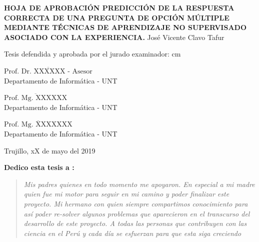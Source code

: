\begin{center}
 {\bf {\Large HOJA DE APROBACIÓN }     
 \vskip 1.5cm
  {\Large PREDICCIÓN DE LA RESPUESTA CORRECTA DE UNA PREGUNTA DE OPCIÓN MÚLTIPLE MEDIANTE TÉCNICAS DE APRENDIZAJE NO SUPERVISADO ASOCIADO CON LA EXPERIENCIA.}}
 \vskip 1cm 
  {\large{José Vicente Clavo Tafur}}\\

 \vskip 1cm
\end{center} 
Tesis defendida y aprobada por el jurado examinador:
 cm
\begin{flushleft} 
$\overline{\mbox{Prof. Dr. XXXXXX - Asesor}}$\\
\vskip -0.5cm
Departamento de Informática - UNT
\end{flushleft} 
\vskip 1cm
\begin{flushleft} 
$\overline{\mbox{Prof. Mg. XXXXXX}}$\\
\vskip -0.5cm
Departamento de Informática - UNT
\end{flushleft} 
\vskip 1cm
\begin{flushleft} 
$\overline{\mbox{Prof. Mg. XXXXXXX}}$\\
\vskip -0.5cm
Departamento de Informática - UNT
\end{flushleft}
\vskip 0.8cm 
\begin{center}    
Trujillo, xX de mayo del 2019
\end{center} 
\newpage


 
 {\bf\Large {Dedico esta tesis a :}}
 \vskip 1cm
\begin{quotation}
{\it Mis padres quienes en todo momento me apoyaron. En especial a mi madre quien fue mi motor para seguir en mi camino y poder finalizar este proyecto.
\vskip 1cm
Mi hermano con quien siempre compartimos conocimiento para así poder re-solver algunos problemas que aparecieron en el transcurso del desarrollo de este proyecto.
\vskip 1cm
A todas las personas que contribuyen con las ciencia en el Perú y cada día se esfuerzan para que esta siga creciendo }
\end{quotation}


\newpage

